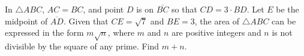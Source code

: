 In $\triangle ABC$, $AC = BC$, and point $D$ is on $\overline{BC}$ so that $CD = 3 \cdot BD$.  Let $E$ be the midpoint of $\overline{AD}$.  Given that $CE = \sqrt{7}$ and $BE = 3$, the area of $\triangle ABC$ can be expressed in the form $m\sqrt{n}$, where $m$ and $n$ are positive integers and $n$ is not divisible by the square of any prime.  Find $m+n$.